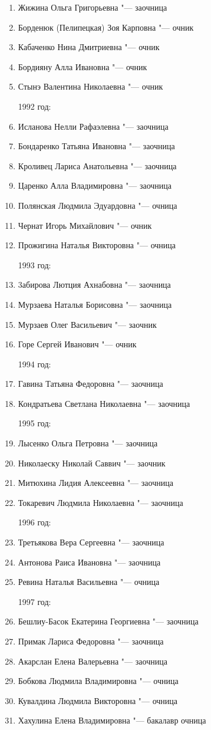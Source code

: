 \begin{enumerate}[nosep]
{1991 год:}
	\item Жижина Ольга Григорьевна "--- заочница
	\item Борденюк (Пелипецкая) Зоя Карповна "--- очник
	\item Кабаченко Нина Дмитриевна "--- очник
	\item Бордияну Алла Ивановна "--- очник
	\item Стынэ Валентина Николаевна "--- очник

{1992 год:}
	\item Исланова Нелли Рафаэлевна "--- заочница
	\item Бондаренко Татьяна Ивановна "--- заочница
	\item Кроливец Лариса Анатольевна "--- заочница
	\item Царенко Алла Владимировна "--- заочница
	\item Полянская Людмила Эдуардовна "--- очница
	\item Чернат Игорь Михайлович "--- очник
	\item Прожигина Наталья Викторовна "--- очница

{1993 год:}
	\item 3абирова Лютция Ахнабовна "--- заочница
	\item Мурзаева Наталья Борисовна "--- заочница
	\item Мурзаев Олег Васильевич "--- заочник
	\item Горе Сергей Иванович "--- очник

\pagebreak

{1994 год:}
	\item Гавина Татьяна Федоровна "--- заочница
	\item Кондратьева Светлана Николаевна "--- заочница

{1995 год:}
	\item Лысенко Ольга Петровна "--- заочница
	\item Николаеску Николай Саввич "--- заочник
	\item Митюхина Лидия Алексеевна "--- заочница
	\item Токаревич Людмила Николаевна "--- заочница

{1996 год:}
	\item Третьякова Вера Сергеевна "--- заочница
	\item Антонова Раиса Ивановна "--- заочница
	\item Ревина Наталья Васильевна "--- очница

{1997 год:}
	\item Бешлиу-Басок Екатерина Георгиевна "--- заочница
	\item Примак Лариса Федоровна "--- заочница 
	\item Акарслан Елена Валерьевна "--- заочница
	\item Бобкова Людмила Владимировна "--- очница
	\item Кувалдина Людмила Викторовна "--- очница
	\item Хахулина Елена Владимировна "--- бакалавр очница


\end{enumerate}

